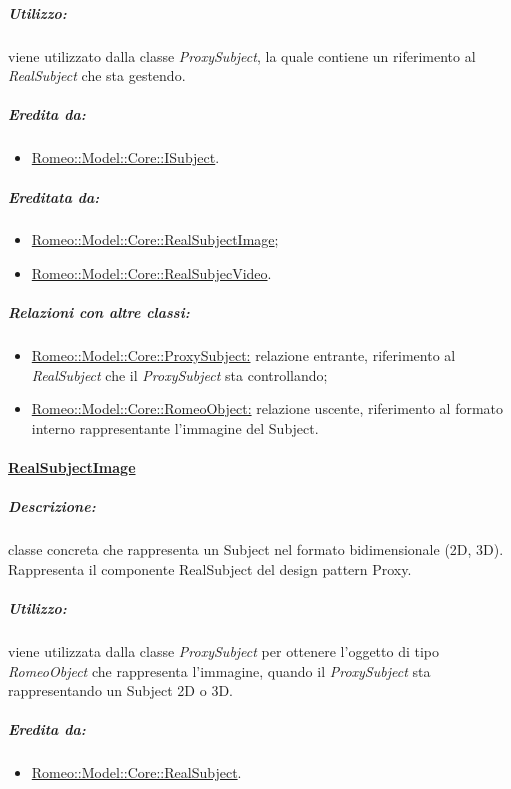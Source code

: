 		\subparagraph{Utilizzo:} viene utilizzato dalla classe \textsl{ProxySubject}, la quale contiene un riferimento al \textsl{RealSubject} che sta gestendo.
		
		\subparagraph{Eredita da:}
			\begin{itemize}
				\item \hyperref[core_isub]{Romeo::Model::Core::ISubject}.
			\end{itemize}
			
		\subparagraph{Ereditata da:}
			\begin{itemize}
				\item \hyperref[core_realimage]{Romeo::Model::Core::RealSubjectImage};
				\item \hyperref[core_realvideo]{Romeo::Model::Core::RealSubjecVideo}.
			\end{itemize}
			
		\subparagraph{Relazioni con altre classi:}
			\begin{itemize}
				\item \hyperref[core_proxysub]{Romeo::Model::Core::ProxySubject:} relazione entrante, riferimento al \textsl{RealSubject} che il \textsl{ProxySubject} sta controllando;
				\item \hyperref[]{Romeo::Model::Core::RomeoObject:} relazione uscente, riferimento al formato interno rappresentante l'immagine del Subject\g{}.
			\end{itemize}
			
		\paragraph{\underline{RealSubjectImage}}
		\label{core_realimage}
			
			\subparagraph{Descrizione:} classe concreta che rappresenta un Subject\g{} nel formato bidimensionale (2D, 3D).
			\\Rappresenta il componente RealSubject del design pattern\g{} Proxy.
			
			\subparagraph{Utilizzo:} viene utilizzata dalla classe \textsl{ProxySubject} per ottenere l'oggetto di tipo \textsl{RomeoObject} che rappresenta l'immagine, quando il \textsl{ProxySubject} sta rappresentando un Subject\g{} 2D o 3D.
			
			\subparagraph{Eredita da:}
				\begin{itemize}
					\item \hyperref[core_realsub]{Romeo::Model::Core::RealSubject}.
				\end{itemize}
					
